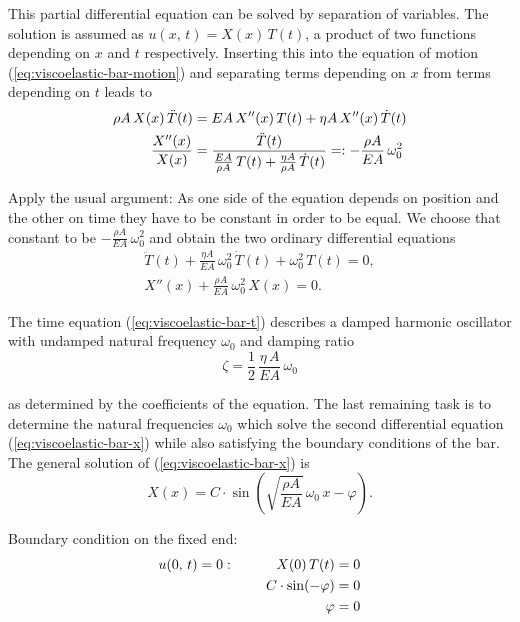 This partial differential equation can be solved by separation of variables. The solution is assumed as $u(x,\,t) = X(x)\,T(t)$, a product of two functions depending on $x$ and $t$ respectively. Inserting this into the equation of motion (\ref{eq:viscoelastic-bar-motion}) and separating terms depending on $x$ from terms depending on $t$ leads to
%
\begin{align}
\rho A\,X(x)\,\ddot{T}(t) &= EA\,X''(x)\,T(t) + \eta A\,X''(x)\,\dot{T}(t)\notag \\
\frac{X''(x)}{X(x)} &= \frac{\ddot{T}(t)}{\frac{EA}{\rho A}\,T(t) + \frac{\eta A}{\rho A}\,\dot{T}(t)} =: -\frac{\rho A}{EA}\,\omega_0^2\label{eq:viscoelastic-bar-separated}
\end{align}

Apply the usual argument: As one side of the equation depends on position and the other on time they have to be constant in order to be equal. We choose that constant to be $-\frac{\rho A}{EA}\,\omega_0^2$ and obtain the two ordinary differential equations
%
\begin{align}
\ddot{T}(t) + \frac{\eta A}{EA}\,\omega_0^2\,\dot{T}(t) + \omega_0^2\,T(t) = 0,\label{eq:viscoelastic-bar-t} \\
X''(x) + \frac{\rho A}{EA}\,\omega_0^2\,X(x) = 0.\label{eq:viscoelastic-bar-x}
\end{align}

The time equation (\ref{eq:viscoelastic-bar-t}) describes a damped harmonic oscillator with undamped natural frequency $\omega_0$ and damping ratio
%
\begin{equation}
\zeta = \frac{1}{2}\,\frac{\eta\,A}{EA}\,\omega_0\label{eq:viscoelastic-bar-result-zeta}
\end{equation}

as determined by the coefficients of the equation. The last remaining task is to determine the natural frequencies $\omega_0$ which solve the second differential equation (\ref{eq:viscoelastic-bar-x}) while also satisfying the boundary conditions of the bar. The general solution of (\ref{eq:viscoelastic-bar-x}) is
%
\begin{equation}
X(x) = C\cdot\sin\left(\sqrt{\frac{\rho A}{EA}}\,\omega_0\,x - \varphi\right).
\end{equation}

Boundary condition on the fixed end:
%
\begin{align}
u(0,\,t) = 0: \quad\quad\quad X(0)\,T(t) &= 0 \notag \\
C\cdot\sin(-\varphi) &= 0 \notag \\
\varphi &= 0
\end{align}

